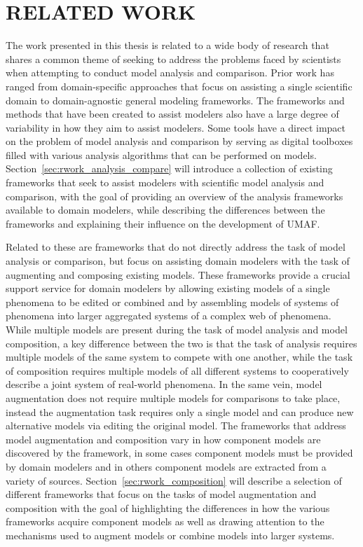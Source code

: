 \chapter{RELATED WORK\label{chapter:related_work}}
The work presented in this thesis is related to a wide body of research that shares a common theme of seeking to address the problems faced by scientists when attempting to conduct model analysis and comparison.
Prior work has ranged from domain-specific approaches that focus on assisting a single scientific domain to domain-agnostic general modeling frameworks.
The frameworks and methods that have been created to assist modelers also have a large degree of variability in how they aim to assist modelers.
Some tools have a direct impact on the problem of model analysis and comparison by serving as digital toolboxes filled with various analysis algorithms that can be performed on models.
Section~\ref{sec:rwork_analysis_compare} will introduce a collection of existing frameworks that seek to assist modelers with scientific model analysis and comparison, with the goal of providing an overview of the analysis frameworks available to domain modelers, while describing the differences between the frameworks and explaining their influence on the development of UMAF.

Related to these are frameworks that do not directly address the task of model analysis or comparison, but focus on assisting domain modelers with the task of augmenting and composing existing models.
These frameworks provide a crucial support service for domain modelers by allowing existing models of a single phenomena to be edited or combined and by assembling models of systems of phenomena into larger aggregated systems of a complex web of phenomena.
While multiple models are present during the task of model analysis and model composition, a key difference between the two is that the task of analysis requires multiple models of the same system to compete with one another, while the task of composition requires multiple models of all different systems to cooperatively describe a joint system of real-world phenomena.
In the same vein, model augmentation does not require multiple models for comparisons to take place, instead the augmentation task requires only a single model and can produce new alternative models via editing the original model.
The frameworks that address model augmentation and composition vary in how component models are discovered by the framework, in some cases component models must be provided by domain modelers and in others component models are extracted from a variety of sources.
Section~\ref{sec:rwork_composition} will describe a selection of different frameworks that focus on the tasks of model augmentation and composition with the goal of highlighting the differences in how the various frameworks acquire component models as well as drawing attention to the mechanisms used to augment models or combine models into larger systems.

